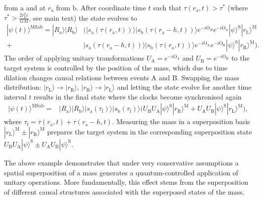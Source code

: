 \documentclass[a4paper,11pt]{article}
\newcommand{\ket}{\rangle}
\newcommand{\be}{\begin{equation}}
\newcommand{\ee}[1]{\label{#1} \end{equation}}
\begin{document}
from $ \mathrm a$ and at $r_\mathrm{a}$ from $\mathrm b$.
After coordinate time $t$ such that $\tau(r_\mathrm{a}, t)>\tau^*$ (where $\tau^*>\frac{2r_\mathrm{b}^2 c}{GM}$, see main text) the state evolves to
\be
\begin{split}
 |\psi(t)\ket^\mathrm{MSab}=|R_\mathrm{a}\ket|R_\mathrm{b}\ket&\bigg(|s_\mathrm{a}(\tau(r_\mathrm{a}, t))\ket|s_\mathrm{b}(\tau(r_\mathrm{a}-h,t))\ket e^{-i\mathrm{O}_B}e^{-i\mathrm{O}_\mathrm{A}}|\psi\ket^\mathrm{S}|r_\mathrm{L}\ket^\mathrm{M} \\
 +&|s_\mathrm{a}(\tau(r_\mathrm{a}-h, t))\ket|s_\mathrm{b}(\tau(r_\mathrm{a},t))\ket e^{-i\mathrm{O_A}}e^{-i\mathrm{O_B}}|\psi\ket^\mathrm{S}|r_\mathrm{R}\ket^\mathrm{M}\bigg).
 \end{split}
 \ee{state_switch1}
 The order of applying unitary  transformations $U_\mathrm{A}=e^{-i\mathrm{O_A}}$ and $U_\mathrm{B}=e^{-i\mathrm{ O_B}}$ to the target system is controlled by the position of the mass, which due to time dilation changes causal relations between  events $ \mathrm A$ and $ \mathrm B$. Swapping the mass distribution: $|r_\mathrm{L}\ket\rightarrow|r_\mathrm{R}\ket$, $|r_\mathrm{R}\ket\rightarrow|r_\mathrm{L}\ket$ and letting the state evolve for another time interval $t$ results in the final state where the clocks become synchronised again
 \be
\begin{split}
 |\psi(t)\ket^\mathrm{MSab}=&|R_\mathrm{a}\ket|R_\mathrm{b}\ket|s_\mathrm{a}(\tau_\mathrm{f})\ket|s_\mathrm{b}(\tau_\mathrm{f})\ket
 \bigg( U_\mathrm{B}U_\mathrm{A}|\psi\ket^\mathrm{S}|r_\mathrm{R}\ket^\mathrm{M} + U_\mathrm{A}U_\mathrm{B}|\psi\ket^\mathrm{S}|r_\mathrm{L}\ket^\mathrm{M}\bigg),
 \end{split}
 \ee{state_switch2}
where $\tau_\mathrm{f}=\tau(r_\mathrm{a}, t)+\tau(r_\mathrm{a}-h, t)$. Measuring the mass in a superposition basis $|r_\mathrm{L}\ket^\mathrm{M} \pm |r_\mathrm{R}\ket^\mathrm{M}$ prepares the target system in the corresponding superposition state  $U_\mathrm{B}U_\mathrm{A}|\psi\ket^\mathrm{S} \pm U_\mathrm{A}U_\mathrm{B}|\psi\ket^\mathrm{S}$.

The above example demonstrates that under very conservative assumptions a spatial superposition of a mass generates a quantum-controlled application of unitary operations. More fundamentally, this effect {stems from the} %
superposition of different causal structures associated with the superposed states of the mass.

\end{document}
